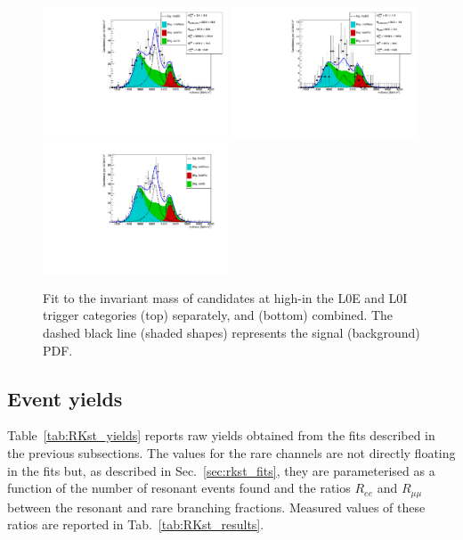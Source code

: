 %
\begin{figure}[h!]
\centering
\includegraphics[width=0.49\textwidth]{RKst/figs/Fit/fit_EE/KstEE_high_L0E.pdf}
\includegraphics[width=0.49\textwidth]{RKst/figs/Fit/fit_EE/KstEE_high_L0I.pdf}
\includegraphics[width=0.49\textwidth]{RKst/figs/Fit/fit_EE/fit_EEh.pdf}
\caption{Fit to the \mKpiee invariant mass of \BdToKstee candidates at high-\qsq in the L0E and L0I trigger categories (top) separately, and (bottom) combined. The dashed black line (shaded shapes) represents the signal (background) PDF.}
\label{fig:fitEE_high}
\end{figure}

\subsection{Event yields}

Table~\ref{tab:RKst_yields} reports raw yields obtained from the
fits described in the previous subsections. The values for the rare channels are not
directly floating in the fits but, as described in Sec.~\ref{sec:rkst_fits}, they are parameterised
as a function of the number of resonant events found and the ratios $R_{ee}$ and $R_{\mu\mu}$
between the resonant and rare branching fractions. Measured values of these ratios are reported 
in Tab.~\ref{tab:RKst_results}.

